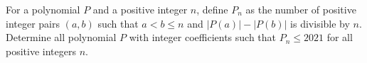 For a polynomial $P$ and a positive integer $n$, define $P_n$ as the number of positive integer pairs $(a,b)$ such that $a<b \leq n$ and $|P(a)|-|P(b)|$ is divisible by $n$. Determine all polynomial $P$ with integer coefficients such that $P_n \leq 2021$ for all positive integers $n$.